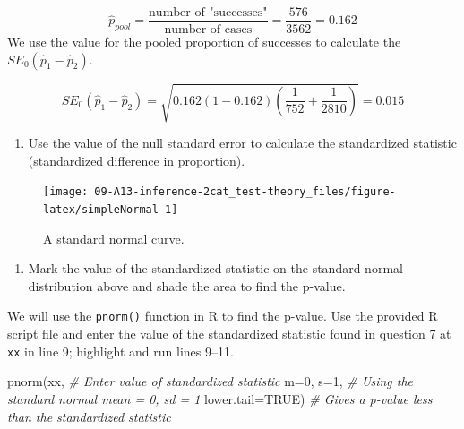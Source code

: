 \documentclass[
]{report}
\newenvironment{Shaded}{\begin{snugshade}}{\end{snugshade}}
\newcommand{\AttributeTok}[1]{\textcolor[rgb]{0.77,0.63,0.00}{#1}}
\newcommand{\CommentTok}[1]{\textcolor[rgb]{0.56,0.35,0.01}{\textit{#1}}}
\newcommand{\ConstantTok}[1]{\textcolor[rgb]{0.00,0.00,0.00}{#1}}
\newcommand{\DecValTok}[1]{\textcolor[rgb]{0.00,0.00,0.81}{#1}}
\newcommand{\FunctionTok}[1]{\textcolor[rgb]{0.00,0.00,0.00}{#1}}
\newcommand{\NormalTok}[1]{#1}
\providecommand{\tightlist}{%
  \setlength{\itemsep}{0pt}\setlength{\parskip}{0pt}}
\begin{document}
\[\hat{p}_{pool} = \frac{\text{number of "successes"}}{\text{number of cases}} = \frac{576}{3562} = 0.162\]
We use the value for the pooled proportion of successes to calculate the \(SE_0(\hat{p}_1 - \hat{p}_2)\).

\[
SE_0(\hat{p}_1-\hat{p}_2)=\sqrt{0.162(1-0.162)\left(\frac{1}{752}+\frac{1}{2810}\right)} = 0.015
\]

\begin{enumerate}
\def\labelenumi{\arabic{enumi}.}
\setcounter{enumi}{6}
\tightlist
\item
  Use the value of the null standard error to calculate the standardized statistic (standardized difference in proportion).
\end{enumerate}

\vspace{1in}

\begin{figure}

{\centering \texttt{[image: 09-A13-inference-2cat\_test-theory\_files/figure-latex/simpleNormal-1]} 

}

\caption{A standard normal curve.}\label{fig:simpleNormal}
\end{figure}

\begin{enumerate}
\def\labelenumi{\arabic{enumi}.}
\setcounter{enumi}{7}
\tightlist
\item
  Mark the value of the standardized statistic on the standard normal distribution above and shade the area to find the p-value.
\end{enumerate}

\vspace{0.1in}
\newpage

We will use the \texttt{pnorm()} function in R to find the p-value. Use the provided R script file and enter the value of the standardized statistic found in question 7 at \texttt{xx} in line 9; highlight and run lines 9--11.

\begin{Shaded}
\begin{Highlighting}[]
\FunctionTok{pnorm}\NormalTok{(xx, }\CommentTok{\# Enter value of standardized statistic}
      \AttributeTok{m=}\DecValTok{0}\NormalTok{, }\AttributeTok{s=}\DecValTok{1}\NormalTok{, }\CommentTok{\# Using the standard normal mean = 0, sd = 1}
      \AttributeTok{lower.tail=}\ConstantTok{TRUE}\NormalTok{) }\CommentTok{\# Gives a p{-}value less than the standardized statistic}
\end{Highlighting}
\end{Shaded}
\end{document}
